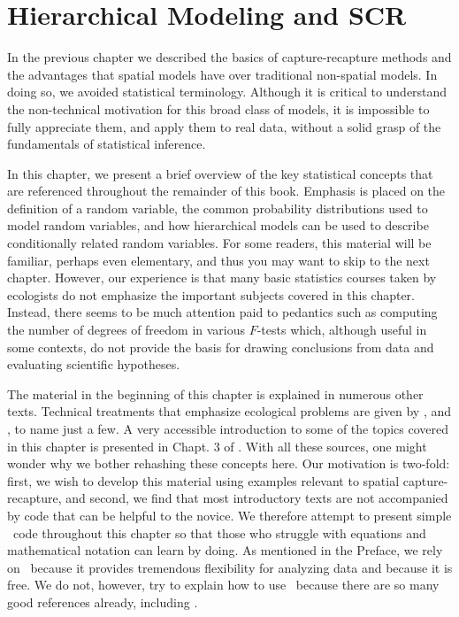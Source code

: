 \chapter{
Hierarchical Modeling and SCR
}
\label{chapt.modeling}


\vspace{.3in}

In the previous chapter we described the basics of capture-recapture
methods and the advantages that spatial models have over
traditional non-spatial models. In doing so, we avoided statistical
terminology. Although it is critical to
understand the non-technical motivation for this broad class of
models, it is impossible to fully appreciate them, and apply them to
real data, without a solid grasp of the fundamentals of statistical
inference.

In this chapter, we present a brief overview of the key
statistical concepts that are referenced throughout the remainder of
this book. Emphasis is placed on the definition of a random variable,
the common probability distributions used to model random variables,
and how hierarchical models can be used to describe conditionally
related random variables. For some readers, this material will be
familiar, perhaps even elementary, and thus you may want to skip to the next
chapter. However, our experience is that many basic statistics courses
taken by ecologists do not emphasize the important subjects covered in
this chapter. Instead, there seems to be much attention paid to pedantics
such as
computing the number of degrees of freedom in
various $F$-tests which, although useful in some contexts, do not
provide the basis for drawing conclusions from data and evaluating
scientific hypotheses. %

The material in the
beginning of this chapter is explained in numerous other
texts. %
Technical treatments that emphasize ecological
problems are given by
\citet{williams_etal:2002}, \citet{royle_dorazio:2008} and
\citet{link_barker:2010}, to name just a few. A very accessible introduction to some of the
topics covered in this chapter is presented in Chapt. 3 of
\citet{mackenzie_etal:2006}. With all these sources, one
might wonder why we bother rehashing these concepts here. Our motivation is
two-fold: first, we wish to develop this material using examples
relevant to spatial capture-recapture, and second, we find that most
introductory texts are not accompanied by code that can
be helpful to the novice. We therefore attempt to present simple \R~code
throughout this chapter so that those who struggle with equations and
mathematical notation can learn by doing. As mentioned in the Preface,
we rely on \R~because it provides tremendous flexibility for analyzing
data and because it is free. We do not, however, try to explain how to
use \R~because there are so many good references already, including
\citet{venables_ripley:2002,bolker:2008,venables_etal:2012}.


